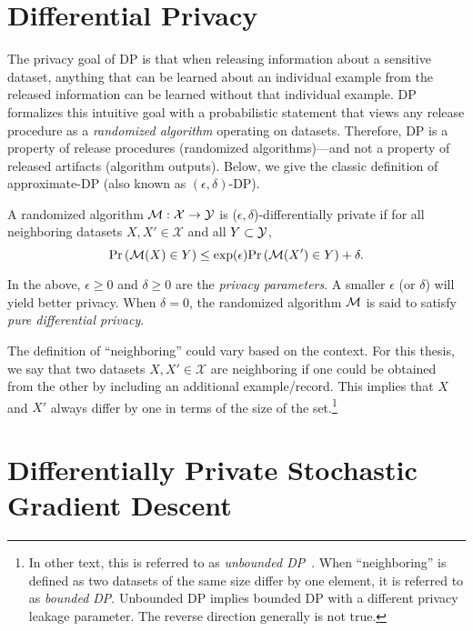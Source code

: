 \section{Differential Privacy}
The privacy goal of DP is that when releasing information about a sensitive dataset, anything that can be learned about an individual example from the released information can be learned without that individual example.
DP formalizes this intuitive goal with a probabilistic statement that views any release procedure as a \emph{randomized algorithm} operating on datasets.
Therefore, DP is a property of release procedures (randomized algorithms)---and not a property of released artifacts (algorithm outputs).
Below, we give the classic definition of approximate-DP (also known as $(\epsilon, \delta)$-DP).
\begin{defi}[Approximate-DP]
A randomized algorithm $\mathcal{M}: \mathcal{X} \to \mathcal{Y}$ is ($\epsilon, \delta$)-differentially private if for all neighboring datasets $X, X'\in\mathcal{X}$ and all $Y \subset \mathcal{Y}$, 
$$
\mathrm{Pr}\left(\mathcal{M}(X) \in Y\right) \le \exp( \epsilon ) \mathrm{Pr}\left( \mathcal{M}(X') \in Y \right) + \delta.
\label{eq:epsilon_delta_dp}
$$
\end{defi}
In the above, $\epsilon \ge 0$ and $\delta \ge 0$ are the \emph{privacy parameters}.
A smaller $\epsilon$ (or $\delta$) will yield better privacy.
When $\delta=0$, the randomized algorithm $\mathcal{M}$ is said to satisfy \emph{pure differential privacy}.

The definition of ``neighboring'' could vary based on the context. 
For this thesis, we say that two datasets $X, X' \in \mathcal{X}$ are neighboring if one could be obtained from the other by including an additional example/record. 
This implies that $X$ and $X'$ always differ by one in terms of the size of the set.\footnote{
In other text, this is referred to as \emph{unbounded DP}~\cite{kifer2011no}. When ``neighboring'' is defined as two datasets of the same size differ by one element, it is referred to as \emph{bounded DP}.
Unbounded DP implies bounded DP with a different privacy leakage parameter.
The reverse direction generally is not true.
}



\section[Differentially Private Stochastic Gradient Descent]{\large Differentially Private Stochastic Gradient Descent}

